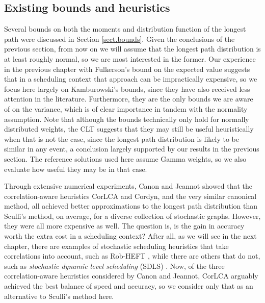 \documentclass[12pt]{article}
\begin{document}
\subsection{Existing bounds and heuristics}
\label{subsect.results_existing}

Several bounds on both the moments and distribution function of the longest path were discussed in Section \ref{sect.bounds}. Given the conclusions of the previous section, from now on we will assume that the longest path distribution is at least roughly normal, so we are most interested in the former. Our experience in the previous chapter with Fulkerson's bound on the expected value suggests that in a scheduling context that approach can be impractically expensive, so we focus here largely on Kamburowski's bounds, since they have also received less attention in the literature. Furthermore, they are the only bounds we are aware of on the variance, which is of clear importance in tandem with the normality assumption. Note that although the bounds technically only hold for normally distributed weights, the CLT suggests that they may still be useful heuristically when that is not the case, since the longest path distribution is likely to be similar in any event, a conclusion largely supported by our results in the previous section. The reference solutions used here assume Gamma weights, so we also evaluate how useful they may be in that case.

Through extensive numerical experiments, Canon and Jeannot showed that the correlation-aware heuristics CorLCA and Cordyn, and the very similar canonical method, all achieved better approximations to the longest path distribution than Sculli's method, on average, for a diverse collection of stochastic graphs. However, they were all more expensive as well. The question is, is the gain in accuracy worth the extra cost in a scheduling context? After all, as we will see in the next chapter, there are examples of stochastic scheduling heuristics that take correlations into account, such as Rob-HEFT \cite{can10}, while there are others that do not, such as {\em stochastic dynamic level scheduling} (SDLS) \cite{li15}. Now, of the three correlation-aware heuristics considered by Canon and Jeannot, CorLCA arguably achieved the best balance of speed and accuracy, so we consider only that as an alternative to Sculli's method here.
\end{document}
